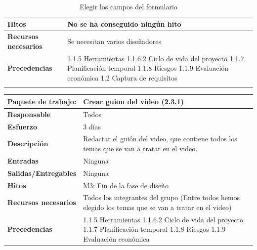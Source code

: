 \documentclass{report}
\begin{document}
\begin{center}
\begin{longtable}{|p{6cm}|p{6cm}|}
                    \hline
                    \textbf{Hitos} & No se ha conseguido ningún hito\\
                    \hline
                    \textbf{Recursos necesarios} & Se necesitan varios diseñadores\\
                    \hline
                    \textbf{Precedencias} & 1.1.5 Herramientas
                                            1.1.6.2 Ciclo de vida del proyecto
                                            1.1.7 Planificación temporal
                                            1.1.8 Riesgos
                                            1.1.9 Evaluación económica
                                            1.2 Captura de requisitos\\
                    \hline
                    \caption{Elegir los campos del formulario}
                \end{longtable}
                \clearpage
                \begin{longtable}{|p{6cm}|p{6cm}|}
                    \hline
                    \textbf{Paquete de trabajo:} & Crear guion del video (2.3.1)\\
                    \hline
                    \textbf{Responsable} & Todos\\
                    \hline
                    \textbf{Esfuerzo} & 3 días\\
                    \hline
                    \textbf{Descripción} & Redactar el guión del video, que contiene todos los temas que se van a tratar en el video.\\
                    \hline
                    \textbf{Entradas} & Ninguna\\
                    \hline
                    \textbf{Salidas/Entregables} & Ninguna \\
                    \hline
                    \textbf{Hitos} & M3: Fin de la fase de diseño\\
                    \hline
                    \textbf{Recursos necesarios} & Todos los integrantes del grupo (Entre todos hemos elegido los temas que se van a tratar en el video)\\
                    \hline
                    \textbf{Precedencias} & 1.1.5 Herramientas
                                            1.1.6.2 Ciclo de vida del proyecto
                                            1.1.7 Planificación temporal
                                            1.1.8 Riesgos
                                            1.1.9 Evaluación económica

\end{longtable}
\end{center}
\end{document}
